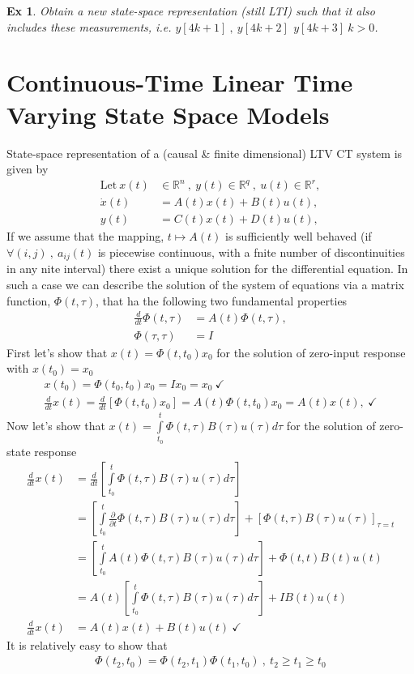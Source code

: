 \documentclass[twoside]{article}
\newtheorem{exmp}[theorem]{Ex}
\begin{document}
\begin{exmp}
	Obtain a new state-space representation (still LTI) such that it also includes these measurements, i.e. $y[4k+1] \ , \ y[4k+2] \, \ y[4k+3] \ k > 0$.
\end{exmp}

\newpage

\section{Continuous-Time Linear Time Varying State Space Models} 

State-space representation of a (causal \& finite dimensional) LTV CT system is given by
%
\begin{align*}
  \mathrm{Let} \ x(t) &\in \mathbb{R}^n \ , \ y(t) \in \mathbb{R}^q \ ,\  u(t) \in \mathbb{R}^r , \\
  \dot{x}(t) &= A(t) x(t) + B(t) u(t) , \\
  y(t) &= C(t) x(t) + D(t) u(t) , 
\end{align*}
%
If we assume that the mapping, $t \mapsto A(t)$ is sufficiently well behaved (if $\forall (i,j) \ , \ a_{ij}(t)$ is piecewise continuous, with a fnite number of discontinuities in any nite interval)
there exist a unique solution for the differential equation. In such a case we can describe the solution of the system of equations via a matrix function, $\Phi(t , \tau)$, that ha the following 
two fundamental properties
%
\begin{align*}
	\frac{d}{dt} \Phi(t , \tau) &= A(t) \Phi(t , \tau) ,
	\\
	\Phi(\tau , \tau) &= I
\end{align*}
%
First let's show that $x(t) = \Phi(t , t_0) x_0$ for the solution of zero-input response with $x(t_0) = x_0$
%
\begin{align*}
	x(t_0) = \Phi(t_0 , t_0) x_0 = I x_0 = x_0 \ \checkmark
	\\
	\frac{d}{dt} x(t) = \frac{d}{dt} \left[ \Phi(t , t_0) x_0 \right] = A(t) \Phi(t , t_0 ) x_0 = A(t) x(t) , \ \checkmark
\end{align*}
%
Now let's show that $x(t) = \int\limits_{t_0}^{t} \Phi(t , \tau) B(\tau) u(\tau) d\tau$ for the solution of zero-state response 
%
\begin{align*}
	\frac{d}{dt} x(t) &= \frac{d}{dt} \left[ \int\limits_{t_0}^{t} \Phi(t , \tau) B(\tau) u(\tau) d\tau \right]
	\\
	&= \left[ \int\limits_{t_0}^{t} \frac{\partial}{\partial t} \Phi(t , \tau) B(\tau) u(\tau) d\tau \right] + \left[ \Phi(t , \tau) B(\tau) u(\tau) \right]_{\tau = t}
	\\
	&= \left[ \int\limits_{t_0}^{t} A(t) \Phi(t , \tau) B(\tau) u(\tau) d\tau \right] + \Phi(t , t) B(t) u(t) 
	\\
	&= A(t) \left[ \int\limits_{t_0}^{t} \Phi(t , \tau) B(\tau) u(\tau) d\tau \right] + I B(t) u(t) 
	\\
	\frac{d}{dt} x(t) &= A(t) x(t) + B(t) u(t) \ \checkmark
\end{align*}
%
It is relatively easy to show that 
%
\begin{align*}
	\Phi(t_2 , t_0) = \Phi(t_2 , t_1) \Phi(t_1 , t_0) \ , \ t_2 \geq t_1 \geq t_0
\end{align*}
\end{document}
